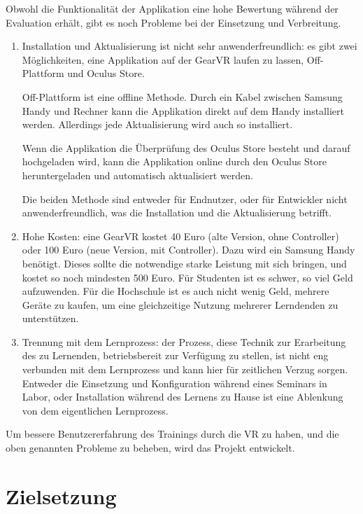 Obwohl die Funktionalität der Applikation eine hohe Bewertung während der Evaluation erhält, gibt es noch Probleme bei der Einsetzung und Verbreitung.
\begin{enumerate}

\item Installation und Aktualisierung ist nicht sehr anwenderfreundlich: es gibt zwei Möglichkeiten, eine Applikation auf der GearVR laufen zu lassen, Off-Plattform und Oculus Store.

Off-Plattform ist eine offline Methode. Durch ein Kabel zwischen Samsung Handy und Rechner kann die Applikation direkt auf dem Handy installiert werden. Allerdings jede Aktualisierung wird auch so installiert.

Wenn die Applikation die Überprüfung des Oculus Store besteht und darauf hochgeladen wird, kann die Applikation online durch den Oculus Store heruntergeladen und automatisch aktualisiert werden.

Die beiden Methode sind entweder für Endnutzer, oder für Entwickler nicht anwenderfreundlich, was die Installation und die Aktualisierung betrifft.

\item Hohe Kosten: eine GearVR kostet 40 Euro (alte Version, ohne Controller) oder 100 Euro (neue Version, mit Controller). Dazu wird ein Samsung Handy benötigt. Dieses sollte die notwendige starke Leistung mit sich bringen, und kostet so noch mindesten 500 Euro. Für Studenten ist es schwer, so viel Geld aufzuwenden. Für die Hochschule ist es auch nicht wenig Geld, mehrere Geräte zu kaufen, um eine gleichzeitige Nutzung mehrerer Lerndenden zu unterstützen.

\item Trennung mit dem Lernprozess: der Prozess, diese Technik zur Erarbeitung des zu Lernenden, betriebsbereit zur Verfügung zu stellen, ist nicht eng verbunden mit dem Lernprozess und kann hier für zeitlichen Verzug sorgen. Entweder die Einsetzung und Konfiguration während eines Seminars in Labor, oder Installation während des Lernens zu Hause ist eine Ablenkung von dem eigentlichen Lernprozess.

\end{enumerate}

Um bessere Benutzererfahrung des Trainings durch die VR zu haben, und die oben genannten Probleme zu beheben, wird das Projekt entwickelt.

\section{Zielsetzung}

